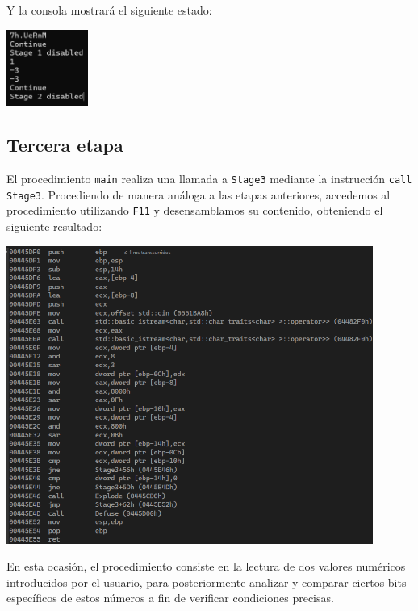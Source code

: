 \documentclass[11pt,a4paper]{article}
\begin{document}
\noindent Y la consola mostrará el siguiente estado:

\begin{center}
\includegraphics[width=0.2\textwidth]{s2-3.png}
\end{center}
\vspace{1ex}

\subsection{Tercera etapa}
El procedimiento \texttt{main} realiza una llamada a \texttt{Stage3} mediante la instrucción \texttt{call Stage3}. Procediendo de manera análoga a las etapas anteriores, accedemos al procedimiento utilizando \texttt{F11} y desensamblamos su contenido, obteniendo el siguiente resultado:

\begin{center}
\includegraphics[width=0.9\textwidth]{s3-1.png}
\end{center}

\vspace{3ex}

\noindent En esta ocasión, el procedimiento consiste en la lectura de dos valores numéricos introducidos por el usuario, para posteriormente analizar y comparar ciertos bits específicos de estos números a fin de verificar condiciones precisas.\vspace{2ex}
\end{document}
